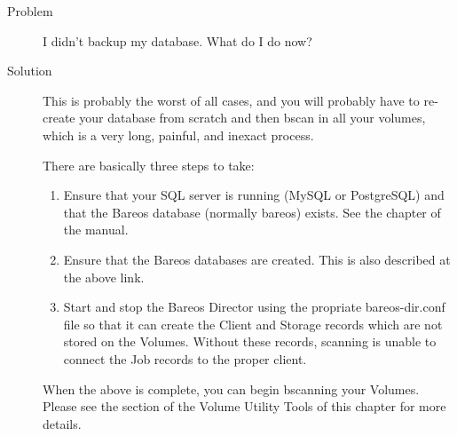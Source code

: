 \begin{description}
\item[Problem]
  I didn't backup my database. What do I do now?
\item[Solution]
  This is probably the worst of all cases, and you will probably have
  to re-create your database from scratch and then bscan in all your
  volumes, which is a very long, painful, and inexact process.

There are basically three steps to take:

\begin{enumerate}
\item Ensure that your SQL server is running (MySQL or PostgreSQL)
   and that the Bareos database (normally bareos) exists.  See the
    chapter of the manual.
\item Ensure that the Bareos databases are created. This is also
   described at the above link.
\item Start and stop the Bareos Director using the propriate
   bareos-dir.conf file so that it can create the Client and
   Storage records which are not stored on the Volumes.  Without these
   records, scanning is unable to connect the Job records to the proper
  client.
\end{enumerate}

When the above is complete, you can begin bscanning your Volumes. Please
see the  section of the Volume Utility Tools of this
chapter for more details.

\end{description}
